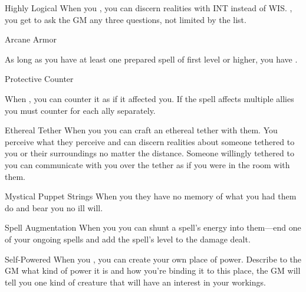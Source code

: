 \documentclass[8pt]{extarticle}
\begin{document}
\begin{multicols}{2}
\begin{amove}{Highly Logical}
  When you , you can discern realities with INT instead of
  WIS. \onMassiveSuccess, you get to ask the GM any three questions,
  not limited by the list.
\end{amove}

\begin{amove}{Arcane Armor}

  As long as you have at least one prepared spell of first level or
  higher, you have .
\end{amove}

\begin{amove}{Protective Counter}

  When , you can counter it as if it affected you. If the spell
  affects multiple allies you must counter for each ally separately.
\end{amove}

\begin{amove}{Ethereal Tether}
  When you 
  you can craft an ethereal tether with them. You perceive what they
  perceive and can discern realities about someone tethered to you or
  their surroundings no matter the distance. Someone willingly
  tethered to you can communicate with you over the tether as if you
  were in the room with them.
\end{amove}

\begin{amove}{Mystical Puppet Strings}
  When you  they
  have no memory of what you had them do and bear you no ill will.
\end{amove}

\begin{amove}{Spell Augmentation}
  When you  you can shunt a
  spell’s energy into them—end one of your ongoing spells and add the
  spell’s level to the damage dealt.
\end{amove}

\begin{amove}{Self-Powered}
  When you ,
  you can create your own place of power. Describe to the GM what kind
  of power it is and how you’re binding it to this place, the GM will
  tell you one kind of creature that will have an interest in your
  workings.
\end{amove}


\vfill\null
\end{multicols}
\clearpage
\end{document}
